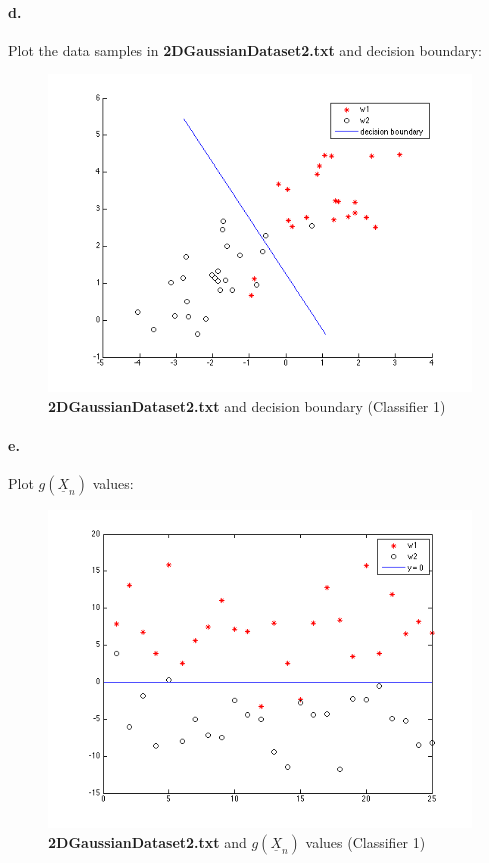 \documentclass[a4paper]{article}
\begin{document}
\paragraph{d.} Plot the data samples in \textbf{2DGaussianDataset2.txt} and decision boundary: \\
\begin{figure}[H]
  \centering
    \includegraphics[scale=.6]{images/2_d.png}
  \caption{\textbf{2DGaussianDataset2.txt} and decision boundary (Classifier 1)}
\end{figure}

\paragraph{e.} Plot $g(\underline{X}_{n})$ values: \\
\begin{figure}[H]
  \centering
    \includegraphics[scale=.6]{images/2_e.png}
  \caption{\textbf{2DGaussianDataset2.txt} and $g(\underline{X}_{n})$ values (Classifier 1)}
\end{figure}
\end{document}
